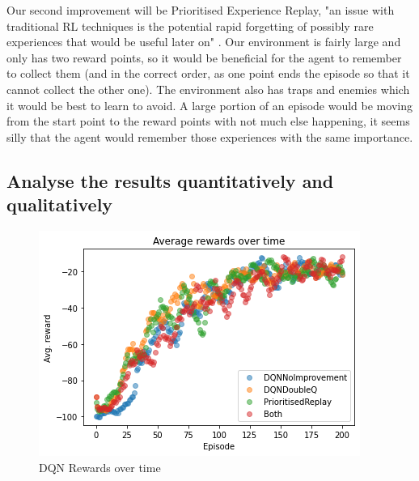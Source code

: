 \documentclass[a4pape, 11pt, english]{article}
\begin{document}
Our second improvement will be Prioritised Experience Replay, "an issue with traditional RL techniques is the potential rapid forgetting of possibly rare experiences that would be useful later on" \citep[p 1]{schaul_prioritized_2015}. Our environment is fairly large and only has two reward points, so it would be beneficial for the agent to remember to collect them (and in the correct order, as one point ends the episode so that it cannot collect the other one). The environment also has traps and enemies which it would be best to learn to avoid. A large portion of an episode would be moving from the start point to the reward points with not much else happening, it seems silly that the agent would remember those experiences with the same importance.

\subsection{Analyse the results quantitatively and qualitatively}

\begin{figure}[h!]
	\begin{center}
		\includegraphics{img/DQNRewardsOverTime.png}
		\caption{DQN Rewards over time}
		\label{fig:DQNRewardsOverTime}
	\end{center}
\end{figure}
\end{document}
